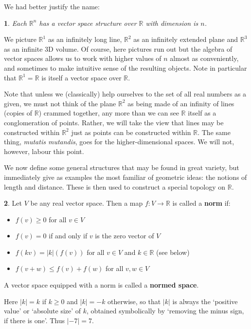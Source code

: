 \documentclass[oneside,english]{amsbook}
\numberwithin{section}{chapter}
\theoremstyle{plain}
\newtheorem{thm}{\protect\theoremname}
\theoremstyle{definition}
\newtheorem{defn}[thm]{\protect\definitionname}
\providecommand{\definitionname}{Definition}
\providecommand{\theoremname}{Theorem}
\begin{document}
We had better justify the name:

\begin{thm}Each $\mathbb{R}^n$ has a vector space structure over $\mathbb{R}$ with dimension is $n$.
\end{thm}

We picture $\mathbb{R}^1$ as an infinitely long line, $\mathbb{R}^2$ as an infinitely extended plane and $\mathbb{R}^3$ as an infinite 3D volume. Of course, here pictures run out but the algebra of vector spaces allows us to work with higher values of $n$ almost as conveniently, and sometimes to make intuitive sense of the resulting objects. Note in particular that $\mathbb{R}^1=\mathbb{R}$ is itself a vector space over $\mathbb{R}$.

Note that unless we (classically) help ourselves to the set of all real numbers as a given, we must not think of the plane $\mathbb{R}^2$ as being made of an infinity of lines (copies of $\mathbb{R}$) crammed together, any more than we can see $\mathbb{R}$ itself as a conglomeration of points. Rather, we will take the view that lines may be constructed within $\mathbb{R}^2$ just as points can be constructed within  $\mathbb{R}$. The same thing, \emph{mutatis mutandis}, goes for the higher-dimensional spaces. We will not, however, labour this point.

We now define some general structures that may be found in great variety, but immediately give as examples the most familiar of geometric ideas: the notions of length and distance. These is then used to construct a special topology on $\mathbb{R}$.

\begin{defn}Let $V$ be any real vector space. Then a map $f:V\to \mathbb{R}$ is called a \textbf{norm} if:
	\begin{itemize}
		\item{$f(v)\ge 0$ for all $v\in V$}
		\item{$f(v) = 0$ if and only if $v$ is the zero vector of $V$}
		\item{$f(kv) = |k|(f(v))$ for all $v\in V$ and $k\in \mathbb{R}$ (see below)}
		\item{$f(v + w) \le f(v) + f(w)$ for all $v, w\in V$}
	\end{itemize}
A vector space equipped with a norm is called a \textbf{normed space}.
\end{defn}

Here $|k| = k$ if $k\ge 0$ and $|k|=-k$ otherwise, so that $|k|$ is always the `positive value' or `absolute size' of $k$, obtained symbolically by `removing the minus sign, if there is one'. Thus $|-7|=7$.
\end{document}
